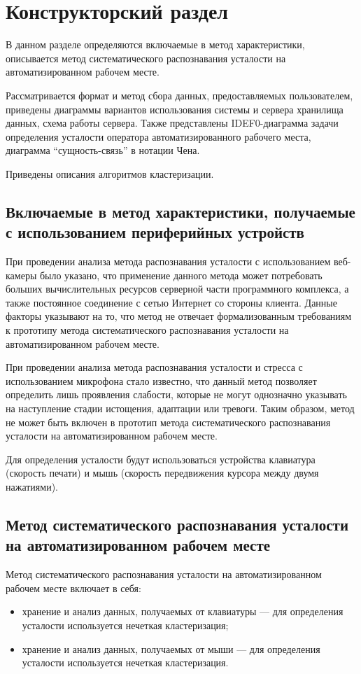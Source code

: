 \section{Конструкторский раздел}
В данном разделе определяются включаемые в метод характеристики, описывается метод систематического распознавания усталости на автоматизированном рабочем месте.

Рассматривается формат и метод сбора данных, предоставляемых пользователем, приведены диаграммы вариантов использования системы и сервера хранилища данных, схема работы сервера. Также представлены IDEF0-диаграмма задачи определения усталости оператора автоматизированного рабочего места, диаграмма ``сущность-связь'' в нотации Чена.

Приведены описания алгоритмов кластеризации.

\subsection{Включаемые в метод характеристики, получаемые с использованием периферийных устройств}

При проведении анализа метода распознавания усталости с использованием веб-камеры было указано, что применение данного метода может потребовать больших вычислительных ресурсов серверной части программного комплекса, а также постоянное соединение с сетью Интернет со стороны клиента. Данные факторы указывают на то, что метод не отвечает формализованным требованиям к прототипу метода систематического распознавания усталости на автоматизированном рабочем месте.

При проведении анализа метода распознавания усталости и стресса с использованием микрофона стало известно, что данный метод позволяет определить лишь проявления слабости, которые не могут однозначно указывать на наступление стадии истощения, адаптации или тревоги. Таким образом, метод не может быть включен в прототип метода систематического распознавания усталости на автоматизированном рабочем месте.

Для определения усталости будут использоваться устройства клавиатура (скорость печати) и мышь (скорость передвижения курсора между двумя нажатиями).

\subsection{Метод систематического распознавания усталости на автоматизированном рабочем месте}
Метод систематического распознавания усталости на автоматизированном рабочем месте включает в себя:
\begin{itemize}[leftmargin=1.6\parindent]
\item хранение и анализ данных, получаемых от клавиатуры --- для определения усталости используется нечеткая кластеризация;
\item хранение и анализ данных, получаемых от мыши --- для определения усталости используется нечеткая кластеризация.
\end{itemize}

